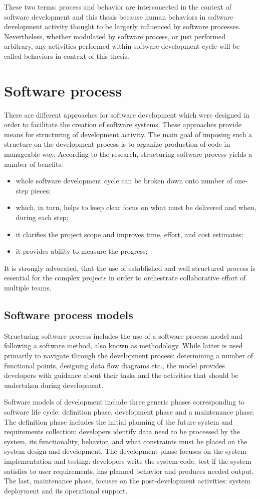 These two terms: process and behavior are interconected in the context of software development 
and this thesis because human behaviors in software development activity thought to be largerly 
influenced by software processes. Nevertheless, whether modulated by software process, or just 
performed arbitrary, any activities performed within software development cycle will be called 
behaviors in context of this thesis.

\section{Software process}\label{software.processes}
There are different approaches for software development which were designed in order to 
facilitate the creation of software systems. These approaches provide means for 
structuring of development activity. The main goal of imposing such a structure on the 
development process is to organize production of code in manageable way. 
According to the research, structuring software process yields a number of benefits:
\begin{itemize}
 \item whole software development cycle can be broken down onto number of one-step pieces;
 \item which, in turn, helps to keep clear focus on what must be delivered and when, during each step;
 \item it clarifies the project scope and improves time, effort, and cost estimates;
 \item it provides ability to measure the progress;
\end{itemize}
It is strongly advocated, that the use of established and well structured process is 
essential for the complex projects in order to orchestrate collaborative effort 
of multiple teams. 

\subsection{Software process models}
Structuring software process includes the use of a software process model and following 
a software method, also known as methodology. While latter is used primarily to navigate 
through the development process: determining a number of functional points, 
designing data flow diagrams etc., the model provides developers with guidance about their 
tasks and the activities that should be undertaken during development. 

Software models of development include three generic phases corresponding to software
life cycle: definition phase, development phase and a maintenance phase. 
The definition phase includes the initial planning of the future system and 
requirements collection: developers identify data need to be processed by the system, 
its functionality, behavior, and what constraints must be placed on the system design 
and development. 
The development phase focuses on the system implementation and testing: developers 
write the system code, test if the system satisfies to user requirements, 
has planned behavior and produces needed output. 
The last, maintenance phase, focuses on the post-development activities: 
system deployment and its operational support. 

